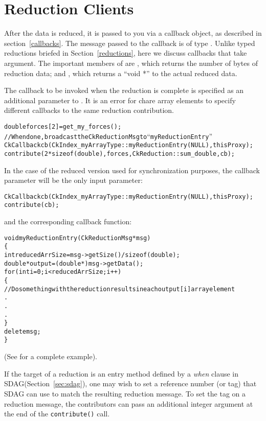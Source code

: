 \section{Reduction Clients}

\label{reductionClients}

After the data is reduced, it is passed to you via a callback object,
as described in section~\ref{callbacks}.  The message passed to
the callback is of type . Unlike typed reductions
briefed in Section~\ref{reductions}, here we discuss callbacks that take 
 argument.
The important members of  are
, which returns the number of bytes of reduction data; and
, which returns a ``void *'' to the actual reduced data.

The callback to be invoked when the reduction is complete is specified
as an additional parameter to . It is an error for chare array elements
to specify different callbacks to the same reduction contribution.
\begin{alltt}
    double forces[2]=get_my_forces();
    // When done, broadcast the CkReductionMsg to ``myReductionEntry''
    CkCallback cb(CkIndex_myArrayType::myReductionEntry(NULL), thisProxy);
    contribute(2*sizeof(double), forces,CkReduction::sum_double, cb);
\end{alltt}

In the case of the reduced version used for synchronization purposes, the
callback parameter will be the only input parameter:
\begin{alltt}
    CkCallback cb(CkIndex_myArrayType::myReductionEntry(NULL), thisProxy);
    contribute(cb);
\end{alltt}

and the corresponding callback function:

\begin{alltt}
void myReductionEntry(CkReductionMsg *msg)
\{
  int reducedArrSize=msg->getSize() / sizeof(double);
  double *output=(double *) msg->getData();
  for(int i=0 ; i<reducedArrSize ; i++)
  \{
   // Do something with the reduction results in each output[i] array element
   .
   .
   .
  \}
  delete msg;
\}
\end{alltt}

(See  for a complete example).

If the target of a reduction is an entry method defined by a
\emph{when} clause in SDAG(Section~\ref{sec:sdag}), one may wish to set a
reference number (or tag) that SDAG can use to match the resulting
reduction message. To set the tag on a reduction message, the
contributors can pass an additional integer argument at the end of the
{\tt contribute()} call.

